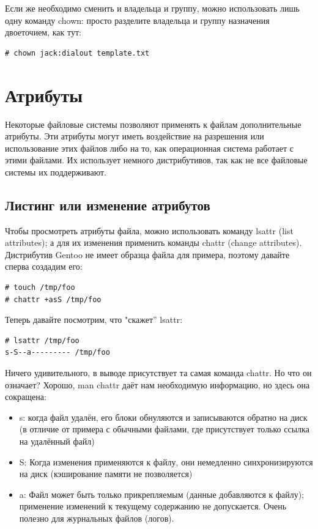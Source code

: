 \documentclass[10pt]{book}
\begin{document}
Если же необходимо сменить и владельца и группу, можно использовать лишь одну команду chown: просто разделите владельца и группу назначения двоеточием, как тут:

\vspace{3mm}
\begin{tcolorbox}
\begin{lstlisting}
# chown jack:dialout template.txt
\end{lstlisting}
\end{tcolorbox}

\section {Атрибуты}

Некоторые файловые системы позволяют применять к файлам дополнительные атрибуты. Эти атрибуты могут иметь воздействие на разрешения или использование этих файлов либо на то, как операционная система работает с этими файлами. Их использует немного дистрибутивов, так как не все файловые системы их поддерживают. 

\subsection {Листинг или изменение атрибутов}

Чтобы просмотреть атрибуты файла, можно использовать команду lsattr (list attributes); а для их изменения применить команды chattr (change attributes). Дистрибутив Gentoo не имеет образца файла для примера, поэтому давайте сперва создадим его:

\vspace{3mm}
\begin{tcolorbox}
\begin{lstlisting}
# touch /tmp/foo
# chattr +asS /tmp/foo
\end{lstlisting}
\end{tcolorbox}

Теперь давайте посмотрим, что "скажет'' lsattr:

\vspace{3mm}
\begin{tcolorbox}
\begin{lstlisting}
# lsattr /tmp/foo
s-S--a--------- /tmp/foo
\end{lstlisting}
\end{tcolorbox}

Ничего удивительного, в выводе присутствует та самая команда chattr. Но что  он означает? Хорошо, man chattr даёт нам необходимую информацию, но здесь она сокращена:
\begin{itemize}
\item s: когда файл удалён, его блоки обнуляются и записываются обратно на диск (в отличие от примера с обычными файлами, где присутствует только ссылка на удалённый файл)
\item S: Когда изменения применяются к файлу, они немедленно синхронизируются на диск (кэширование памяти не позволяется)
\item a: Файл может быть только прикрепляемым (данные добавляются к файлу); применение изменений к текущему содержанию не допускается. Очень полезно для журнальных файлов (логов).
\end{itemize}
\end{document}
